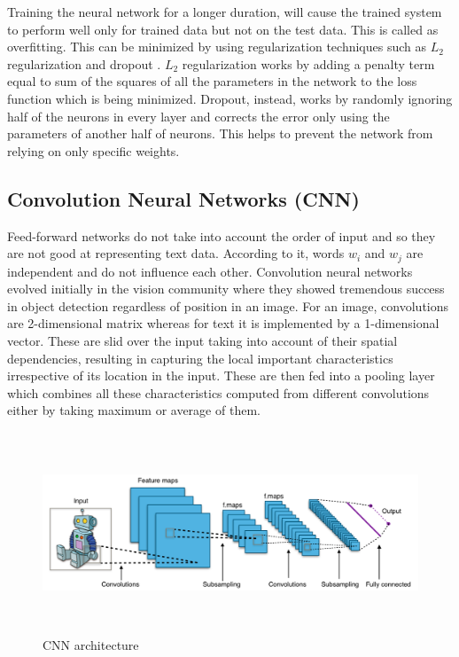 \documentclass[a4paper, 11pt]{article}
\begin{document}
Training the neural network for a longer duration, will cause the trained system to perform well only for trained data but not on the test data. This is called as overfitting. This can be minimized by using regularization techniques such as $L_2$ regularization and dropout \parencite{Hinton2012}. $L_2$ regularization works by adding a penalty term equal to sum of the squares of all the parameters in the network to the loss function which is being minimized. Dropout, instead, works by randomly ignoring half of the neurons in every layer and corrects the error only using the parameters of another half of neurons. This helps to prevent the network from relying on only specific weights.

\subsection{Convolution Neural Networks (CNN)}

Feed-forward networks do not take into account the order of input and so they are not good at representing text data. According to it, words $w_i$ and $w_j$ are independent and do not influence each other. 
Convolution neural networks \parencite{lecun-bengio-95a} evolved initially in the vision community where they showed tremendous success in object detection regardless of position in an image. For an image, convolutions are 2-dimensional matrix whereas for text it is implemented by a 1-dimensional vector. These are slid over the input taking into account of their spatial dependencies, resulting in capturing the local important characteristics irrespective of its location in the input. These are then fed into a pooling layer which combines all these characteristics computed from different convolutions either by taking maximum or average of them.

\begin{figure}[H]
    \centering
    \includegraphics[width=\textwidth,height=6cm,keepaspectratio=true]
    {cnn-1.png}
    \caption{
        CNN architecture \parencite{cnn-1}
    }
    \label{fig:CNN architecture}
\end{figure}
\end{document}
